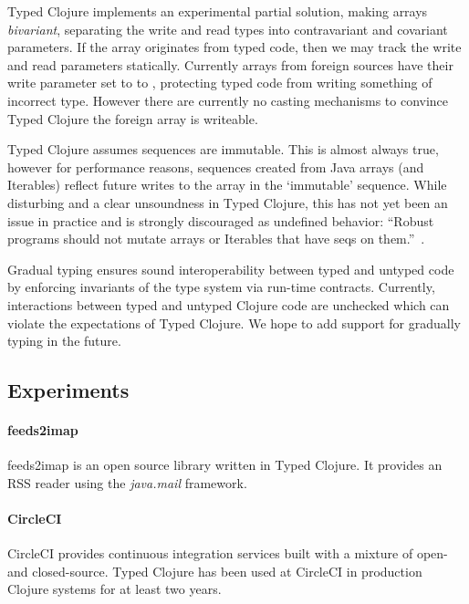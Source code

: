 Typed Clojure implements an experimental partial solution, making arrays \emph{bivariant},
separating the write and read types into contravariant and covariant parameters.
If the array originates from typed code, then we may track the write and read
parameters statically. Currently arrays from foreign sources
have their write parameter set to to \Bot{}, protecting typed code from writing
something of incorrect type. However there are currently no casting mechanisms to 
convince Typed Clojure the foreign array is writeable.

Typed Clojure assumes sequences are immutable. This is almost always true, however
for performance reasons,
sequences created from Java arrays (and Iterables) reflect future writes to the array 
in the `immutable' sequence. While disturbing and a clear unsoundness in Typed Clojure,
this has not yet been an issue in practice and is strongly discouraged as undefined behavior:
``Robust programs should not mutate arrays or Iterables that have seqs on them.''~\cite{CljSeqDoc}.

Gradual typing ensures sound interoperability between typed and untyped code by enforcing
invariants of the type system via run-time contracts.
Currently, interactions between typed and untyped Clojure code are unchecked
which can violate the expectations of Typed Clojure. We hope to add support
for gradually typing in the future.

\subsection{Experiments}
\label{sec:casestudy}

\paragraph{feeds2imap}
feeds2imap is an open source library written in Typed Clojure. It provides an
RSS reader using the \emph{java.mail} framework.

\paragraph{CircleCI}
CircleCI %
provides continuous integration services built with a mixture of open-
and closed-source.
Typed Clojure has been used at CircleCI in production Clojure systems for at least two years.

